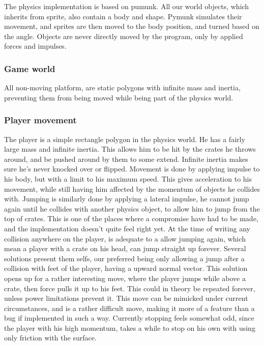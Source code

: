 The physics implementation is based on pumunk. All our world objects, which inherits from sprite, also contain a body and shape. Pymunk simulates their movement, and sprites are then moved to the body position, and turned based on the angle. Objects are never directly moved by the program, only by applied forces and impulses.

\subsubsection{Game world}

All non-moving platform, are static polygons with infinite mass and inertia, preventing them from being moved while being part of the physics world. 

\subsubsection{Player movement}

The player is a simple rectangle polygon in the physics world. He has a fairly large mass and infinite inertia. This allows him to be hit by the crates he throws around, and be pushed around by them to some extend. Infinite inertia makes sure he's never knocked over or flipped. Movement is done by applying impulse to his body, but with a limit to his maximum speed. This gives acceleration to his movement, while still having him affected by the momentum of objects he collides with. Jumping is similarly done by applying a lateral impulse, he cannot jump again until he collides with another physics object, to allow him to jump from the top of crates. This is one of the places where a compromise have had to be made, and the implementation doesn't quite feel right yet. At the time of writing any collision anywhere on the player, is adequate to a allow jumping again, which mean a player with a crate on his head, can jump straight up forever. Several solutions present them selfs, our preferred being only allowing a jump after a collision with feet of the player, having a upward normal vector. This solution opens up for a rather interesting move, where the player jumps while above a crate, then force pulls it up to his feet. This could in theory be repeated forever, unless power limitations prevent it. This move can be mimicked under current circumstances, and is a rather difficult move, making it more of a feature than a bug if implemented in such a way. Currently stopping feels somewhat odd, since the player with his high momentum, takes a while to stop on his own with using only friction with the surface.


